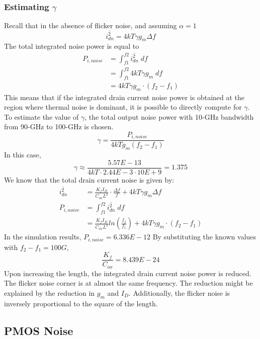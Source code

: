\documentclass[conference]{IEEEtran}
\begin{document}
\subsubsection{Estimating $\gamma$} Recall that in the absence of flicker noise, and assuming $\alpha=1$
\begin{equation*}
	\overline{i_{dn}^{2}} = 4kT\gamma g_{m} \Delta f
\end{equation*}
The total integrated noise power is equal to
\begin{align*}
	P_{i,noise} &= \int_{f1}^{f2}\overline{i_{dn}^{2}}\;df \\
	&= \int_{f1}^{f2} 4kT\gamma g_{m}\; df \\
	&= 4kT\gamma g_m \cdot (f_2 - f_1) 
\end{align*}
This means that if the integrated drain current noise power is obtained at the region where thermal noise is dominant, it is possible to directly compute for $\gamma$. To estimate the value of $\gamma$, the total output noise power with 10-GHz bandwidth from 90-GHz to 100-GHz is chosen. 
\begin{equation*}
	\gamma = \frac{P_{i,noise}}{4kTg_m(f_2-f_1)} 
\end{equation*}
In this case, 
\begin{equation*}
	\gamma \approx \frac{5.57E-13}{4kT\cdot 2.44E-3 \cdot 10E+9} = 1.375
\end{equation*}
We know that the total drain current noise is given by: 
\begin{align*}
		\overline{i_{dn}^{2}} &= \frac{K_f I_D}{C_{ox}L^2} \cdot \frac{\Delta f}{f} + 4kT\gamma g_{m} \Delta f \\    
		P_{i,noise} &= \int_{f1}^{f2}\overline{i_{dn}^{2}}\;df \\
		&= \frac{K_f I_D}{C_{ox}L^2} ln \left(\frac{f_2}{f_1} \right) + 4kT\gamma g_m \cdot (f_2 - f_1)
\end{align*}
In the simulation results, $P_{i,noise} = 6.336E-12$ 
By substituting the known values with $f_2 - f_1 = 100G$,  
\begin{equation*}
	\frac{K_f}{C_{ox}} = 8.439E-24
\end{equation*}
Upon increasing the length, the integrated drain current noise power is reduced. The flicker noise corner is at almost the same frequency. The reduction might be explained by the reduction in $g_m$ and $I_D$. Additionally, the flicker noise is inversely proportional to the square of the length. 

\newpage
\subsection{PMOS Noise}
\end{document}
